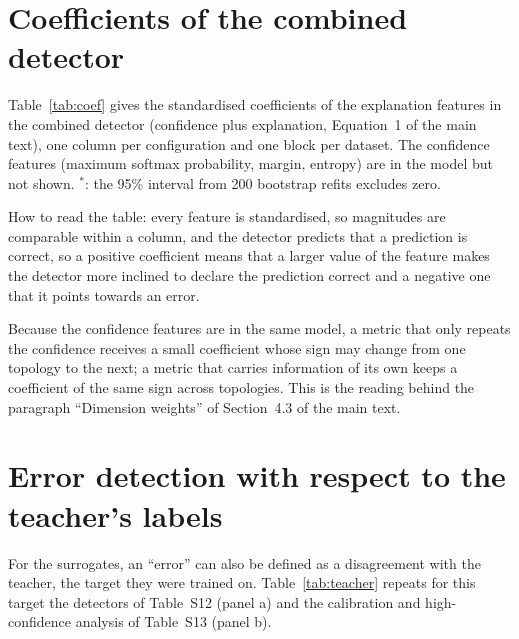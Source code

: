 \documentclass[review,12pt]{elsarticle}
\begin{document}
\clearpage
\section{Coefficients of the combined detector}

Table~\ref{tab:coef} gives the standardised coefficients of the explanation features in the combined detector (confidence plus explanation, Equation~1 of the main text), one column per configuration and one block per dataset. The confidence features (maximum softmax probability, margin, entropy) are in the model but not shown. \(^{*}\): the 95\% interval from 200 bootstrap refits excludes zero.

How to read the table: every feature is standardised, so magnitudes are comparable within a column, and the detector predicts that a prediction is correct, so a positive coefficient means that a larger value of the feature makes the detector more inclined to declare the prediction correct and a negative one that it points towards an error.

Because the confidence features are in the same model, a metric that only repeats the confidence receives a small coefficient whose sign may change from one topology to the next; a metric that carries information of its own keeps a coefficient of the same sign across topologies. This is the reading behind the paragraph ``Dimension weights'' of Section~4.3 of the main text.

\begin{landscape}
\begin{table}[H]
\centering
\scriptsize
\setlength{\tabcolsep}{4pt}
\caption{Standardised coefficients of the explanation features in the combined detector (gold-label errors), AG News (upper block) and SST-2 (lower block).}
\label{tab:coef}
\end{table}
\end{landscape}

\section{Error detection with respect to the teacher's labels}

For the surrogates, an ``error'' can also be defined as a disagreement with the teacher, the target they were trained on. Table~\ref{tab:teacher} repeats for this target the detectors of Table~S12 (panel a) and the calibration and high-confidence analysis of Table~S13 (panel b).
\end{document}
